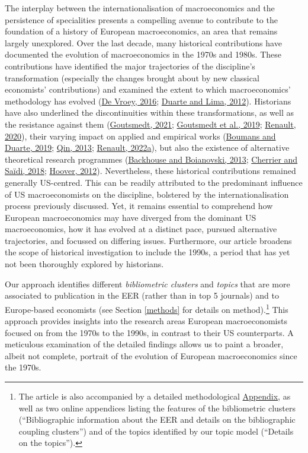 \documentclass[
  12pt,
  onecolumn]{article}
\begin{document}
The interplay between the internationalisation of macroeconomics and the
persistence of specialities presents a compelling avenue to contribute
to the foundation of a history of European macroeconomics, an area that
remains largely unexplored. Over the last decade, many historical
contributions have documented the evolution of macroeconomics in the
1970s and 1980s. These contributions have identified the major
trajectories of the discipline's transformation (especially the changes
brought about by new classical economists' contributions) and examined
the extent to which macroeconomics' methodology has evolved
(\protect\hyperlink{ref-devroey2016}{De Vroey, 2016};
\protect\hyperlink{ref-duartelima2012a}{Duarte and Lima, 2012}).
Historians have also underlined the discontinuities within these
transformations, as well as the resistance against them
(\protect\hyperlink{ref-goutsmedt2021b}{Goutsmedt, 2021};
\protect\hyperlink{ref-goutsmedtetal2019}{Goutsmedt et al., 2019};
\protect\hyperlink{ref-renault2020a}{Renault, 2020}), their varying
impact on applied and empirical works
(\protect\hyperlink{ref-boumans2019}{Boumans and Duarte, 2019};
\protect\hyperlink{ref-qin2013a}{Qin, 2013};
\protect\hyperlink{ref-renault2022}{Renault, 2022a}), but also the
existence of alternative theoretical research programmes
(\protect\hyperlink{ref-backhouseboianovski2013}{Backhouse and
Boianovski, 2013}; \protect\hyperlink{ref-cherrier2018c}{Cherrier and
Saïdi, 2018}; \protect\hyperlink{ref-hoover2012}{Hoover, 2012}).
Nevertheless, these historical contributions remained generally
US-centred. This can be readily attributed to the predominant influence
of US macroeconomists on the discipline, bolstered by the
internationalisation process previously discussed. Yet, it remains
essential to comprehend how European macroeconomics may have diverged
from the dominant US macroeconomics, how it has evolved at a distinct
pace, pursued alternative trajectories, and focussed on differing
issues. Furthermore, our article broadens the scope of historical
investigation to include the 1990s, a period that has yet not been
thoroughly explored by historians.

Our approach identifies different \emph{bibliometric clusters} and
\emph{topics} that are more associated to publication in the EER (rather
than in top 5 journals) and to Europe-based economists (see Section
\ref{methods} for details on method).\footnote{The article is also
  accompanied by a detailed methodological
  \protect\hyperlink{appendix}{Appendix}, as well as two online
  appendices listing the features of the bibliometric clusters
  (``Bibliographic information about the EER and details on the
  bibliographic coupling clusters'') and of the topics identified by our
  topic model (``Details on the topics'').} This approach provides
insights into the research areas European macroeconomists focused on
from the 1970s to the 1990s, in contrast to their US counterparts. A
meticulous examination of the detailed findings allows us to paint a
broader, albeit not complete, portrait of the evolution of European
macroeconomics since the 1970s.
\end{document}
